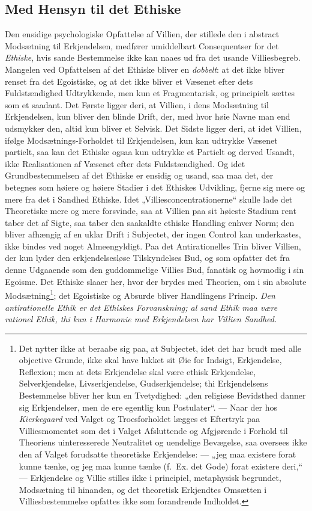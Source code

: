 \documentclass[12pt,a4paper]{book}
\newcommand{\opage}[1]{\marginnote{\footnotesize\textit{[#1]}}}
\begin{document}
\subsection{Med Hensyn til det Ethiske}
\label{ssec:conseq-ethisk}

Den ensidige psychologiske Opfattelse af Villien, der stillede den i abstract Modsætning til
Erkjendelsen, medfører umiddelbart Consequentser for det \emph{Ethiske}, hvis sande Bestemmelse ikke
kan naaes ud fra det usande Villiesbegreb. Mangelen ved Opfattelsen af det Ethiske bliver en
\emph{dobbelt}: at det ikke bliver renset fra det Egoistiske, og at det ikke \opage{196}bliver et
Væsenet efter dets Fuldstændighed Udtrykkende, men kun et Fragmentarisk, og principielt
sættes som et saadant. Det Første ligger deri, at Villien, i dens Modsætning til Erkjendelsen,
kun bliver den blinde Drift, der, med hvor høie Navne man end udsmykker den, altid kun bliver
et Selvisk. Det Sidste ligger deri, at idet Villien, ifølge Modsætnings-Forholdet til
Erkjendelsen, kun kan udtrykke Væsenet partielt, saa kan det Ethiske ogsaa kun udtrykke et
Partielt og derved Usandt, ikke Realisationen af Væsenet efter dets Fuldstændighed. Og idet
Grundbestemmelsen af det Ethiske er ensidig og usand, saa maa det, der betegnes som høiere og
høiere Stadier i det Ethiskes Udvikling, fjerne sig mere og mere fra det i Sandhed Ethiske.
Idet „Villiesconcentrationerne“ skulle lade det Theoretiske mere og mere forsvinde, saa at
Villien paa sit høieste Stadium rent taber det af Sigte, saa taber den saakaldte ethiske
Handling enhver Norm; den bliver afhængig af en uklar Drift i Subjectet, der ingen Control kan
underkastes, ikke bindes ved noget Almeengyldigt. Paa det Antirationelles Trin bliver Villien,
der kun lyder den erkjendelsesløse Tilskyndelses Bud, og som opfatter det fra denne Udgaaende
som den guddommelige Villies Bud, fanatisk og hovmodig i sin Egoisme. Det Ethiske slaaer her,
hvor der brydes med Theorien, om i sin absolute Modsætning\footnote{Det nytter ikke at beraabe
sig paa, at Subjectet, idet det har brudt med alle objective Grunde, ikke skal have lukket sit
Øie for Indsigt, Erkjendelse, Reflexion; men at dets Erkjendelse skal være ethisk Erkjendelse,
Selverkjendelse, Livserkjendelse, Gudserkjendelse; thi Erkjendelsens Bestemmelse bliver her
kun en Tvetydighed: „den religiøse Bevidsthed danner sig Erkjendelser, men de ere egentlig kun
Postulater“. --- Naar der hos \emph{Kierkegaard} ved Valget og Troesforholdet lægges et Eftertryk paa
Villiesmomentet som det i Valget Afsluttende og Afgjørende i Forhold til Theoriens
uinteresserede Neutralitet og uendelige Bevægelse, saa oversees ikke den af Valget forudsatte
theoretiske Erkjendelse: --- „jeg maa existere forat kunne tænke, og jeg maa kunne tænke
(f.\ Ex. det Gode) forat existere deri,“ --- Erkjendelse og Villie stilles ikke i principiel,
metaphysisk begrundet, Modsætning til hinanden, og det theoretisk Erkjendtes Omsætten i
Villiesbestemmelse opfattes ikke som forandrende Indholdet.}; det Egoistiske og Absurde bliver
\opage{197}Handlingens Princip. \emph{Den antirationelle Ethik er det Ethiskes Forvanskning; al
sand Ethik maa være rationel Ethik, thi kun i Harmonie med Erkjendelsen har Villien Sandhed.}
\end{document}
